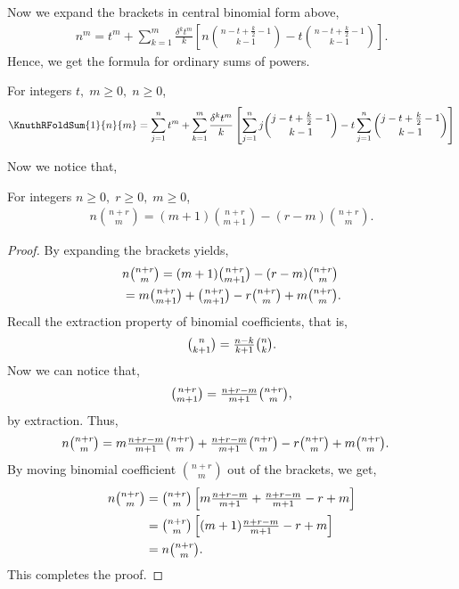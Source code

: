 Now we expand the brackets in central binomial form above,
\begin{align*}
  n^m
  = t^m + \sum_{k=1}^{m} \frac{\delta^{k} t^m}{k}
  \left[ n \binom{n-t+\frac{k}{2}-1}{k-1} - t \binom{n-t+\frac{k}{2}-1}{k-1} \right].
\end{align*}
Hence, we get the formula for ordinary sums of powers.
\begin{corollary}
  \label{cor:centered-ordinary-sums-of-powers}
  For integers $t, \; m\geq 0, \; n \geq 0$,
  \begin{align*}
    \KnuthRFoldSum{1}{n}{m}
    = \sum_{j=1}^n t^m + \sum_{k=1}^{m} \frac{\delta^{k} t^m}{k}
    \left[ \sum_{j=1}^n j \binom{j-t+\frac{k}{2}-1}{k-1}
    - t \sum_{j=1}^n \binom{j-t+\frac{k}{2}-1}{k-1} \right]
  \end{align*}
\end{corollary}
Now we notice that,
\begin{proposition}
  \label{prop:binomial-decomposition}
  For integers $n\geq 0, \; r \geq 0, \; m\geq 0$,
  \begin{align*}
    n \binom{n+r}{m} = (m+1) \binom{n+r}{m+1} - (r-m) \binom{n+r}{m}.
  \end{align*}
  \begin{proof}
    By expanding the brackets yields,
    \begin{align*}
      &n \tbinom{n+r}{m}
      = (m+1) \tbinom{n+r}{m+1} - (r-m) \tbinom{n+r}{m} \\
      &= m \tbinom{n+r}{m+1} + \tbinom{n+r}{m+1} - r \tbinom{n+r}{m}
      + m \tbinom{n+r}{m}.
    \end{align*}
    Recall the extraction property of binomial coefficients, that is,
    \begin{align*}
      \tbinom{n}{k+1} = \tfrac{n-k}{k+1} \tbinom{n}{k}.
    \end{align*}
    Now we can notice that,
    \begin{align*}
      \tbinom{n+r}{m+1} = \tfrac{n+r-m}{m+1} \tbinom{n+r}{m},
    \end{align*}
    by extraction.
    Thus,
    \begin{align*}
      n \tbinom{n+r}{m}
      &= m \tfrac{n+r-m}{m+1} \tbinom{n+r}{m}
      + \tfrac{n+r-m}{m+1} \tbinom{n+r}{m}
      - r \tbinom{n+r}{m} + m \tbinom{n+r}{m}.
    \end{align*}
    By moving binomial coefficient $\binom{n+r}{m}$ out of the brackets, we get,
    \begin{align*}
      n \tbinom{n+r}{m}
      &= \tbinom{n+r}{m} \left[ m \tfrac{n+r-m}{m+1} + \tfrac{n+r-m}{m+1} - r + m \right] \\
      &= \tbinom{n+r}{m} \left[ (m+1) \tfrac{n+r-m}{m+1} - r + m \right] \\
      &= n \tbinom{n+r}{m}.
    \end{align*}
    This completes the proof.
  \end{proof}
\end{proposition}
